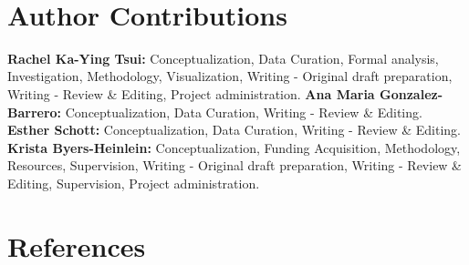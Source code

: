 \documentclass[
  english,
  ,man,floatsintext]{apa6}
\begin{document}
~
~

\hypertarget{author-contributions}{%
\section{Author Contributions}\label{author-contributions}}

\noindent \textbf{Rachel Ka-Ying Tsui:} Conceptualization, Data Curation, Formal analysis, Investigation, Methodology, Visualization, Writing - Original draft preparation, Writing - Review \& Editing, Project administration. \textbf{Ana Maria Gonzalez-Barrero:} Conceptualization, Data Curation, Writing - Review \& Editing. \textbf{Esther Schott:} Conceptualization, Data Curation, Writing - Review \& Editing. \textbf{Krista Byers-Heinlein:} Conceptualization, Funding Acquisition, Methodology, Resources, Supervision, Writing - Original draft preparation, Writing - Review \& Editing, Supervision, Project administration.

\newpage

\hypertarget{references}{%
\section{References}\label{references}}

\begingroup
\setlength{\parindent}{-0.5in}
\end{document}
